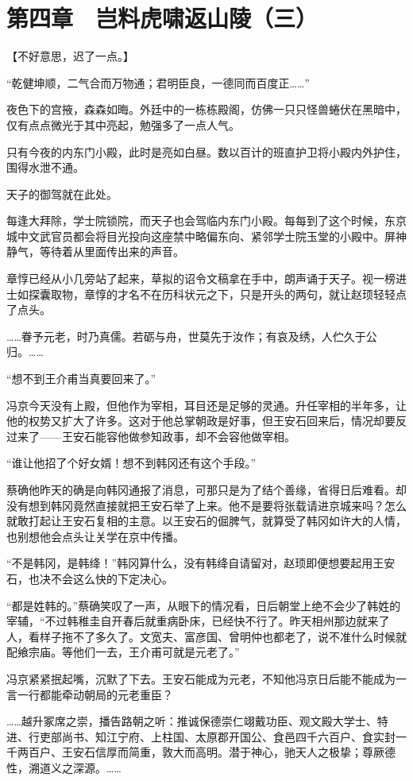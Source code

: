 \section{第四章　岂料虎啸返山陵（三）}

【不好意思，迟了一点。】

“乾健坤顺，二气合而万物通；君明臣良，一德同而百度正……”

夜色下的宫掖，森森如晦。外廷中的一栋栋殿阁，仿佛一只只怪兽蜷伏在黑暗中，仅有点点微光于其中亮起，勉强多了一点人气。

只有今夜的内东门小殿，此时是亮如白昼。数以百计的班直护卫将小殿内外护住，围得水泄不通。

天子的御驾就在此处。

每逢大拜除，学士院锁院，而天子也会驾临内东门小殿。每每到了这个时候，东京城中文武官员都会将目光投向这座禁中略偏东向、紧邻学士院玉堂的小殿中。屏神静气，等待着从里面传出来的声音。

章惇已经从小几旁站了起来，草拟的诏令文稿拿在手中，朗声诵于天子。视一榜进士如探囊取物，章惇的才名不在历科状元之下，只是开头的两句，就让赵顼轻轻点了点头。

……眷予元老，时乃真儒。若砺与舟，世莫先于汝作；有哀及绣，人伫久于公归。……

“想不到王介甫当真要回来了。”

冯京今天没有上殿，但他作为宰相，耳目还是足够的灵通。升任宰相的半年多，让他的权势又扩大了许多。这对于他总掌朝政是好事，但王安石回来后，情况却要反过来了——王安石能容他做参知政事，却不会容他做宰相。

“谁让他招了个好女婿！想不到韩冈还有这个手段。”

蔡确他昨天的确是向韩冈通报了消息，可那只是为了结个善缘，省得日后难看。却没有想到韩冈竟然直接就把王安石举了上来。他不是要将张载请进京城来吗？怎么就敢打起让王安石复相的主意。以王安石的倔脾气，就算受了韩冈如许大的人情，也别想他会点头让关学在京中传播。

“不是韩冈，是韩绛！”韩冈算什么，没有韩绛自请留对，赵顼即便想要起用王安石，也决不会这么快的下定决心。

“都是姓韩的。”蔡确笑叹了一声，从眼下的情况看，日后朝堂上绝不会少了韩姓的宰辅，“不过韩稚圭自开春后就重病卧床，已经快不行了。昨天相州那边就来了人，看样子拖不了多久了。文宽夫、富彦国、曾明仲也都老了，说不准什么时候就配飨宗庙。等他们一去，王介甫可就是元老了。”

冯京紧紧抿起嘴，沉默了下去。王安石能成为元老，不知他冯京日后能不能成为一言一行都能牵动朝局的元老重臣？

……越升冢席之崇，播告路朝之听：推诚保德崇仁翊戴功臣、观文殿大学士、特进、行吏部尚书、知江宁府、上柱国、太原郡开国公、食邑四千六百户、食实封一千两百户、王安石信厚而简重，敦大而高明。潜于神心，驰天人之极挚；尊厥德性，溯道义之深源。……

